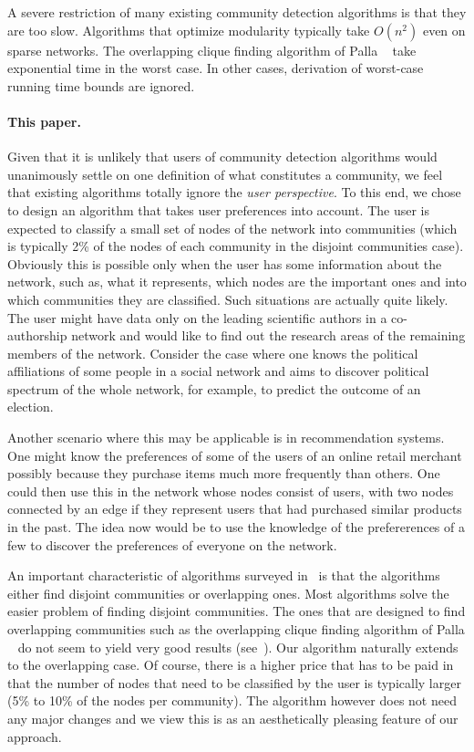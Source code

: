 A severe restriction of many existing community detection algorithms 
is that they are too slow. Algorithms that optimize modularity typically 
take $O(n^2)$ even on sparse networks. The overlapping clique finding 
algorithm of Palla \etal~\cite{PDFV05} take exponential time in the worst case.
In other cases, derivation of worst-case running time bounds are ignored. 

\paragraph{This paper.}
Given that it is unlikely that users of community detection algorithms 
would unanimously settle on one definition of what constitutes a community, 
we feel that existing algorithms totally ignore the \emph{user perspective}. To this 
end, we chose to design an algorithm that takes user preferences into 
account. The user is expected to classify a small set of nodes of the network 
into communities (which is typically 2\% of the nodes of each community in 
the disjoint communities case). Obviously this is possible only when the user has some 
information about the network, such as, what it represents, which nodes 
are the important ones and into which communities they are classified. 
Such situations are actually quite likely. The user might have data only 
on the leading scientific authors in a co-authorship network 
and would like to find out the research areas of the remaining members of the network. 
Consider the case where one knows the political affiliations of some people in 
a social network and aims to discover political spectrum of the whole network, 
for example, to predict the outcome of an election. 

Another scenario where this may be applicable is in recommendation systems. 
One might know the preferences of some of the users of an online retail 
merchant possibly because they purchase items much more frequently than others. 
One could then use this in the network whose nodes consist of users, with two 
nodes connected by an edge if they represent users that had purchased similar products in the past. 
The idea now would be to use the knowledge of the prefererences of a few to 
discover the preferences of everyone on the network. 


An important characteristic of algorithms surveyed in~\cite{LF09} 
is that the algorithms either find disjoint communities or overlapping 
ones. Most algorithms solve the easier problem of finding disjoint communities. 
The ones that are designed to find overlapping communities such as the overlapping clique finding 
algorithm of Palla \etal~\cite{PDFV05} do not seem to yield very good results (see~\cite{LF09}).
Our algorithm naturally extends to the overlapping case. Of course, there is a higher 
price that has to be paid in that the number of nodes that need to be classified by the user 
is typically larger (5\% to 10\% of the nodes per community). The algorithm however 
does not need any major changes and we view this is as an aesthetically pleasing 
feature of our approach. 

